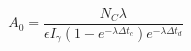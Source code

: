 \documentclass[a4paper,11pt,twoside]{book}
\begin{document}
\begin{equation} \label{eq:Final_Expression_A0}
    A_0 = \frac{N_C \lambda }{\epsilon I_\gamma (1-e^{-\lambda \Delta t_c})e^{-\lambda \Delta t_d}}
\end{equation}

\end{document}
